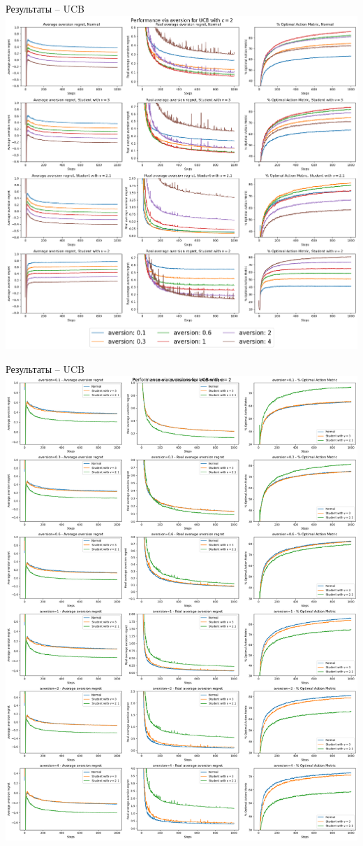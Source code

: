 \documentclass[11pt]{beamer} %
\begin{document}
    \begin{frame}{Результаты -- UCB}
        \includegraphics[scale=0.13,center]{images/theory_images/UCB/avers_distr.png}
    \end{frame}
    \begin{frame}{Результаты -- UCB}
        \includegraphics[scale=0.13,center]{images/theory_images/UCB/avers_avers.png}
    \end{frame}
\end{document}
